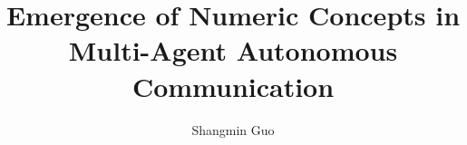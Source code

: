 \documentclass[msc,deptreport,datasci]{infthesis}
\begin{document}
\begin{preliminary}

\title{Emergence of Numeric Concepts in Multi-Agent Autonomous Communication}

\author{Shangmin Guo}



\maketitle



\tableofcontents
\end{preliminary}











% 
% 
% 
\end{document}
